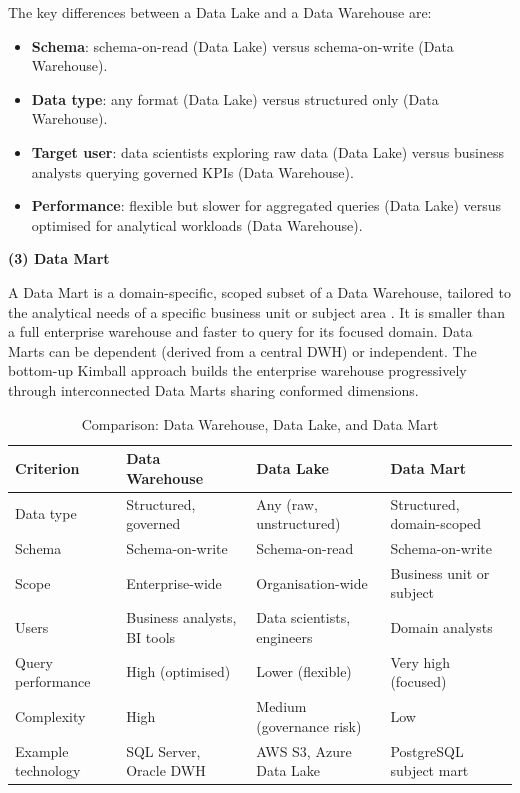 The key differences between a Data Lake and a Data Warehouse are:

\begin{itemize}
    \item \textbf{Schema}: schema-on-read (Data Lake) versus schema-on-write (Data Warehouse).
    \item \textbf{Data type}: any format (Data Lake) versus structured only (Data Warehouse).
    \item \textbf{Target user}: data scientists exploring raw data (Data Lake) versus
    business analysts querying governed KPIs (Data Warehouse).
    \item \textbf{Performance}: flexible but slower for aggregated queries (Data Lake) versus
    optimised for analytical workloads (Data Warehouse).
\end{itemize}

\textbf{(3) Data Mart}

A Data Mart is a domain-specific, scoped subset of a Data Warehouse, tailored to the
analytical needs of a specific business unit or subject area \cite{inmon2005}. It is smaller
than a full enterprise warehouse and faster to query for its focused domain. Data Marts
can be dependent (derived from a central DWH) or independent. The bottom-up Kimball
approach builds the enterprise warehouse progressively through interconnected Data Marts
sharing conformed dimensions.

\begin{table}[H]
\centering
\small
\renewcommand{\arraystretch}{1.4}
\caption{Comparison: Data Warehouse, Data Lake, and Data Mart}
\label{tab:dwh_lake_mart}
\begin{tabular}{|p{3cm}|p{3.7cm}|p{3.7cm}|p{3.7cm}|}
\hline
\rowcolor{blue!15}
\textbf{Criterion} & \textbf{Data Warehouse} & \textbf{Data Lake} & \textbf{Data Mart} \\
\hline
Data type & Structured, governed & Any (raw, unstructured) & Structured, domain-scoped \\
\hline
Schema & Schema-on-write & Schema-on-read & Schema-on-write \\
\hline
Scope & Enterprise-wide & Organisation-wide & Business unit or subject \\
\hline
Users & Business analysts, BI tools & Data scientists, engineers & Domain analysts \\
\hline
Query performance & High (optimised) & Lower (flexible) & Very high (focused) \\
\hline
Complexity & High & Medium (governance risk) & Low \\
\hline
Example technology & SQL Server, Oracle DWH & AWS S3, Azure Data Lake & PostgreSQL subject mart \\
\hline
\end{tabular}
\end{table}

